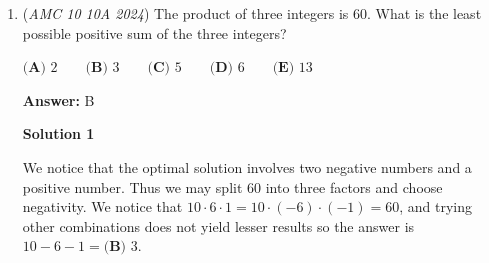 \begin{enumerate}
 



\textbf{Solution 4 (If you don't notice anything)}

Simply, just blindly doing it, the most straightforward way is to shift F all the way back. From ABCDEF:

 $ABCDFE ->ABCFDE ->ABFCDE ->AFBCDE ->FABCDE$

 For E:

 $FABCED -> FABECD -> FAEBCD -> FEABCD$

 For D:

 $FEABDC -> FEADBC -> FEDABC$

 For C:

 $FEDACB -> FEDCAB$

 For B:

 FEDCBA

 That's it, you don't need to do it with A. Still $\boxed{\textbf{(D)}~15}$ moves.

 



\textbf{Solution 5 (Inversions of Permutations)}

Let the letters $A, B, C, D, E, F$ correspond to the numbers $1, 2, 3, 4, 5, 6$ respectively. We want to find the number of swaps required to transform the permutation $1 2 3 4 5 6$ into the permutation $6 5 4 3 2 1$. 

 Here, we let $1 2 3 4 5 6$ be the natural order. Then the total number of inversions of the permutation $6 5 4 3 2 1$ is $1+2+3+4+5=15$. Hence the answer is $\boxed{\textbf{(D)}~15}$



	\item (\textit{AMC 10 10A 2024}) The product of three integers is $60$. What is the least possible positive sum of the 
three integers? 


 $\textbf{(A) }2\qquad\textbf{(B) }3\qquad\textbf{(C) }5\qquad\textbf{(D) }6\qquad\textbf{(E) }13$

 \textbf{Answer: }B



\textbf{Solution 1}

We notice that the optimal solution involves two negative numbers and a positive number. Thus we may split $60$ into three factors and choose negativity. We notice that $10\cdot6\cdot1=10\cdot(-6)\cdot(-1)=60$, and trying other combinations does not yield lesser results so the answer is $10-6-1=\boxed{\textbf{(B) }3}$.

 




\end{enumerate}
